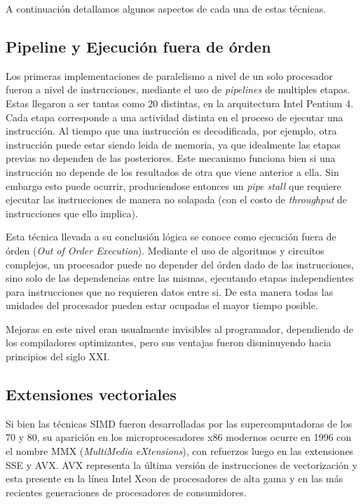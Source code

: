 A continuaci\'on detallamos algunos aspectos de cada una de estas t\'ecnicas.

\subsection{Pipeline y Ejecuci\'on fuera de \'orden}

Los primeras implementaciones de paralelismo a nivel de un solo procesador fueron a nivel de instrucciones, mediante el uso
de \textit{pipelines} de multiples etapas. Estas llegaron a ser tantas como 20 distintas, en la arquitectura
Intel Pentium 4. Cada etapa corresponde a una actividad distinta en el proceso de ejecutar una instrucci\'on.
Al tiempo que una instrucci\'on es decodificada, por ejemplo, otra instrucci\'on puede estar siendo leida
de memoria, ya que idealmente las etapas previas no dependen de las posteriores. Este mecanismo funciona bien
si una instrucci\'on no depende de los resultados de otra que viene anterior a ella. Sin embargo esto puede
ocurrir, produciendose entonces un \textit{pipe stall} que requiere ejecutar las instrucciones de manera no solapada
(con el costo de \textit{throughput} de instrucciones que ello implica).

Esta t\'ecnica llevada a su conclusi\'on l\'ogica se conoce como ejecuci\'on fuera de \'orden (\textit{Out of Order
Execution}). Mediante el uso de algoritmos y circuitos complejos, un procesador puede no depender del \'orden dado
de las instrucciones, sino solo de las dependencias entre las mismas, ejecutando etapas independientes para
instrucciones que no requieren datos entre si. De esta manera todas las unidades del procesador pueden estar
ocupadas el mayor tiempo posible.

Mejoras en este nivel eran usualmente invisibles al programador, dependiendo de los compiladores optimizantes,
pero sus ventajas fueron disminuyendo hacia principios del siglo XXI.

\subsection{Extensiones vectoriales}

Si bien las t\'ecnicas SIMD fueron desarrolladas por las supercomputadoras de los 70 y 80, su aparici\'on en los
microprocesadores x86 modernos ocurre en 1996 con el nombre MMX (\textit{MultiMedia eXtensions}), con refuerzos luego en las
extensiones SSE y AVX. AVX representa la \'ultima versi\'on de instrucciones de vectorizaci\'on y esta presente
en la l\'inea Intel Xeon de procesadores de alta gama y en las m\'as recientes generaciones de procesadores de consumidores.

